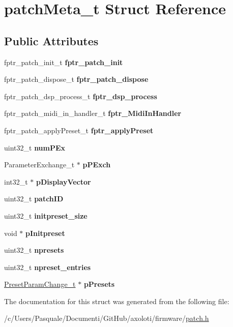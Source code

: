 \hypertarget{structpatchMeta__t}{}\section{patch\+Meta\+\_\+t Struct Reference}
\label{structpatchMeta__t}
\subsection*{Public Attributes}
\begin{DoxyCompactItemize}
\item 
fptr\+\_\+patch\+\_\+init\+\_\+t {\bfseries fptr\+\_\+patch\+\_\+init}
\item 
fptr\+\_\+patch\+\_\+dispose\+\_\+t {\bfseries fptr\+\_\+patch\+\_\+dispose}
\item 
fptr\+\_\+patch\+\_\+dsp\+\_\+process\+\_\+t {\bfseries fptr\+\_\+dsp\+\_\+process}
\item 
fptr\+\_\+patch\+\_\+midi\+\_\+in\+\_\+handler\+\_\+t {\bfseries fptr\+\_\+\+Midi\+In\+Handler}
\item 
fptr\+\_\+patch\+\_\+apply\+Preset\+\_\+t {\bfseries fptr\+\_\+apply\+Preset}
\item 
uint32\+\_\+t {\bfseries num\+P\+Ex}
\item 
Parameter\+Exchange\+\_\+t $\ast$ {\bfseries p\+P\+Exch}
\item 
int32\+\_\+t $\ast$ {\bfseries p\+Display\+Vector}
\item 
uint32\+\_\+t {\bfseries patch\+ID}
\item 
uint32\+\_\+t {\bfseries initpreset\+\_\+size}
\item 
void $\ast$ {\bfseries p\+Initpreset}
\item 
uint32\+\_\+t {\bfseries npresets}
\item 
uint32\+\_\+t {\bfseries npreset\+\_\+entries}
\item 
\hyperlink{structPresetParamChange__t}{Preset\+Param\+Change\+\_\+t} $\ast$ {\bfseries p\+Presets}
\end{DoxyCompactItemize}


The documentation for this struct was generated from the following file\+:\begin{DoxyCompactItemize}
\item 
/c/\+Users/\+Pasquale/\+Documenti/\+Git\+Hub/axoloti/firmware/\hyperlink{patch_8h}{patch.\+h}\end{DoxyCompactItemize}
